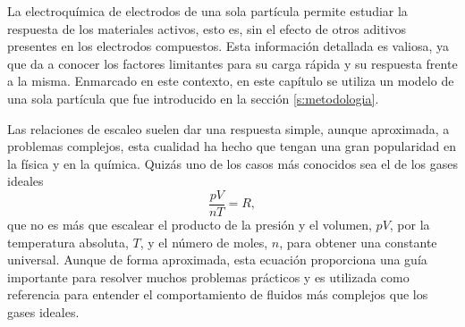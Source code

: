 La electroquímica de electrodos de una sola partícula \cite{ventosa2021, 
heubner2020, takahashi2020, wahab2020, xu2020, tao2019, fukui2011} permite 
estudiar la respuesta  de los materiales activos, esto es, sin el efecto 
de otros aditivos presentes en los electrodos compuestos. Esta información 
detallada es valiosa, ya que da a conocer los factores limitantes para su 
carga rápida y su respuesta frente a la misma. Enmarcado en este contexto, en 
este capítulo se utiliza un modelo de una sola partícula que fue introducido en la 
sección \ref{s:metodologia}.

Las relaciones de escaleo suelen dar una respuesta simple, aunque aproximada, a 
problemas complejos, esta cualidad ha hecho que tengan una gran popularidad 
en la física y en la química. Quizás uno de los casos más conocidos sea el de los
gases ideales
\begin{equation}
    \frac{p V}{n T} = R,
\end{equation}
que no es más que escalear el producto de la presión y el volumen, $p V$, por la
temperatura absoluta, $T$, y el número de moles, $n$, para obtener una constante
universal. Aunque de forma aproximada, esta ecuación proporciona una guía 
importante para resolver muchos problemas prácticos y es utilizada como referencia
para entender el comportamiento de fluidos más complejos que los gases ideales.

